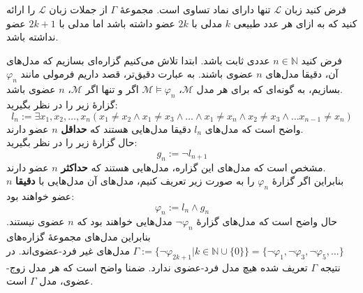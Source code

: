 فرض کنید زبان
$\mathcal{L}$
تنها دارای نماد تساوی است. مجموعهٔ $\Gamma$ از جملات زبان $\mathcal{L}$ را ارائه کنید که به ازای هر عدد طبیعی $k$ مدلی با $2k$ عضو داشته باشد اما مدلی با $2k+1$ عضو نداشته باشد.

\quad\vspace{-0.5}
\begin{ans}
  فرض کنید $n \in \mathbb{N}$ عددی ثابت باشد.
  ابتدا تلاش می‌کنیم گزاره‌ای بسازیم که مدل‌های آن، دقیقا مدل‌های $n$ عضوی باشند. به عبارت دقیق‌تر، قصد داریم فرمولی مانند $\varphi_n$ بسازیم، به گونه‌ای که برای هر مدل $\mathcal{M}$، $\mathcal{M} \models \varphi_n$ اگر و تنها اگر $\mathcal{M}$، $n$ عضوی باشد.\\
  گزارهٔ زیر را در نظر بگیرید:
  $$l_n := \exists x_1,x_2,\dots,x_n (x_1 \neq x_2 \wedge x_1 \neq x_3 \wedge \dots \wedge x_1 \neq x_n \wedge x_2 \neq x_3 \wedge \dots x_{n-1} \neq x_n)$$
  واضح است که مدل‌های $l_n$ دقیقا مدل‌هایی هستند که \textbf{حداقل} $n$ عضو دارند.\\
  حال گزارهٔ زیر را در نظر بگیرید:
  $$g_n := \neg l_{n+1}$$
  مشخص است که مدل‌های این گزاره، مدل‌هایی هستند که \textbf{حداکثر} $n$ عضو دارند.\\
  بنابراین اگر گزارهٔ $\varphi_n$ را به صورت زیر تعریف کنیم، مدل‌های آن مدل‌هایی با \textbf{دقیقا} $n$ عضو خواهند بود:
  $$\varphi_n := l_n \wedge g_n$$
  حال واضح است که مدل‌های گزارهٔ $\neg \varphi_n$ مدل‌هایی خواهند بود که $n$ عضوی نیستند. بنابراین مدل‌های مجموعهٔ گزاره‌های $\Gamma := \{\neg \varphi_{2k+1} | k \in \mathbb{N}\cup\{0\}\} = \{\neg \varphi_1, \neg \varphi_3, \neg \varphi_5, \dots\}$ مدل‌های غیر فرد-عضوی‌اند. در نتیجه $\Gamma$ تعریف شده هیچ مدل فرد-عضوی ندارد. ضمنا واضح است که هر مدل زوج-عضوی، مدل $\Gamma$ است.
\end{ans}
